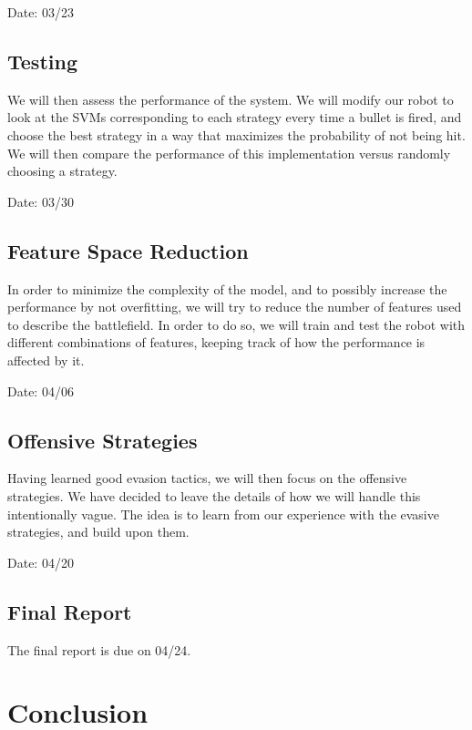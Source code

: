 \documentclass{article}
\theoremstyle{plain}
\theoremstyle{definition}
\theoremstyle{remark}
\begin{document}
Date: 03/23

\subsection{Testing}
We will then assess the performance of the system. We will modify our robot to look at the SVMs corresponding to each strategy every time
a bullet is fired, and choose the best strategy in a way that maximizes the probability of not being hit. We will then compare the
performance of this implementation versus randomly choosing a strategy.

Date: 03/30
\subsection{Feature Space Reduction}
In order to minimize the complexity of the model, and to possibly increase the performance by not overfitting, we will try to reduce
the number of features used to describe the battlefield. In order to do so, we will train and test the robot with different combinations
of features, keeping track of how the performance is affected by it.

Date: 04/06

\subsection{Offensive Strategies}
Having learned good evasion tactics, we will then focus on the offensive strategies. We have decided to leave the details of how we
will handle this intentionally vague. The idea is to learn from our experience with the evasive strategies, and build upon them.

Date: 04/20

\subsection{Final Report}
The final report is due on 04/24.

\section{Conclusion}



\end{document}
